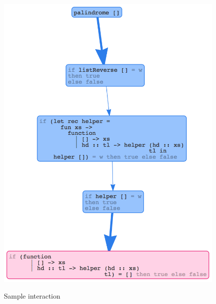 \begin{figure}[t]
\includegraphics[width=\linewidth]{palindrome3} \\
\caption{Sample interaction}
\label{fig:nanomaly-palindrome}
\end{figure}

